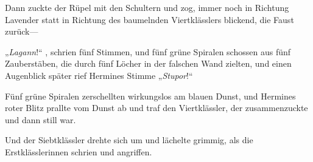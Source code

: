 Dann zuckte der Rüpel mit den Schultern und zog, immer noch in Richtung Lavender statt in Richtung des baumelnden Viertklässlers blickend, die Faust zurück—

„\emph{Lagann}!“ , schrien fünf Stimmen, und fünf grüne Spiralen schossen aus fünf Zauberstäben, die durch fünf Löcher in der falschen Wand zielten, und einen Augenblick später rief Hermines Stimme „\emph{Stupor}!“

Fünf grüne Spiralen zerschellten wirkungslos am blauen Dunst, und Hermines roter Blitz prallte vom Dunst ab und traf den Viertklässler, der zusammenzuckte und dann still war.

Und der Siebtklässler drehte sich um und lächelte grimmig, als die Erstklässlerinnen schrien und angriffen.

\later

